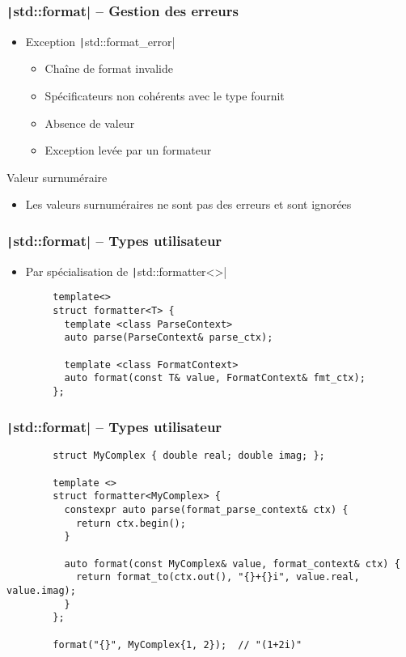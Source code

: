 \documentclass[C++.tex]{subfiles}
\begin{document}
\begin{frame}[fragile]
	\frametitle{\texttt|std::format| -- Gestion des erreurs}
	\begin{itemize}
		\item Exception \texttt|std::format_error|
		\begin{itemize}
			\item Chaîne de format invalide
			\item Spécificateurs non cohérents avec le type fournit
			\item Absence de valeur
			\item Exception levée par un formateur
		\end{itemize}
	\end{itemize}

	\begin{block}{Valeur surnuméraire}
		\begin{itemize}
			\item Les valeurs surnuméraires ne sont pas des erreurs et sont ignorées
		\end{itemize}
	\end{block}
\end{frame}

\begin{frame}[fragile]
	\frametitle{\texttt|std::format| -- Types utilisateur}
	\begin{itemize}
		\item Par spécialisation de \texttt|std::formatter<>|
	\end{itemize}

	\begin{verbatim}
		template<>
		struct formatter<T> {
		  template <class ParseContext>
		  auto parse(ParseContext& parse_ctx);

		  template <class FormatContext>
		  auto format(const T& value, FormatContext& fmt_ctx);
		};
	\end{verbatim}
\end{frame}

\begin{frame}[fragile]
	\frametitle{\texttt|std::format| -- Types utilisateur}
	\begin{verbatim}
		struct MyComplex { double real; double imag; };

		template <>
		struct formatter<MyComplex> {
		  constexpr auto parse(format_parse_context& ctx) {
		    return ctx.begin();
		  }
		
		  auto format(const MyComplex& value, format_context& ctx) {
		    return format_to(ctx.out(), "{}+{}i", value.real, value.imag);
		  }
		};

		format("{}", MyComplex{1, 2});  // "(1+2i)"
	\end{verbatim}
\end{frame}
\end{document}
